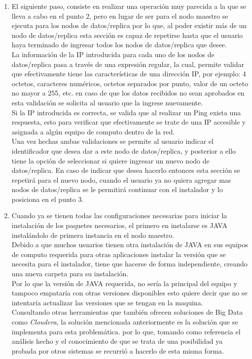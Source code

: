 \begin{enumerate}
	\item El siguiente paso, consiste en realizar una operación muy parecida a la que se lleva a cabo en el punto 2, pero en lugar de ser para el nodo maestro se ejecuta para los nodos de datos/replica por lo que, al poder existir más de un nodo de datos/replica esta sección es capaz de repetirse hasta que el usuario haya terminado de ingresar todos los nodos de datos/replica que desee.
	\\
	La información de la IP introducida para cada uno de los nodos de datos/replica pasa a través de una expresión regular, la cual, permite validar que efectivamente tiene las características de una dirección IP, por ejemplo: 4 octetos, caracteres numéricos, octetos separados por punto, valor de un octeto no mayor a 255, etc. en caso de que los datos recibidos no sean aprobados en esta validación se solicita al usuario que la ingrese nuevamente.
	\\
	Si la IP introducida es correcta, se valida que al realizar un Ping exista una respuesta, esto para verificar que efectivamente se trate de una IP accesible y asignada a algún equipo de computo dentro de la red.
	\\
	Una vez hechas ambas validaciones se permite al usuario indicar el identificador que desea dar a este nodo de datos/replica, y posterior a ello tiene la opción de seleccionar si quiere ingresar un nuevo nodo de datos/replica. En caso de indicar que desea hacerlo entonces esta sección se repetirá para el nuevo nodo, cuando el usuario ya no quiera agregar mas nodos de datos/replica se le permitirá continuar con el instalador y lo posiciona en el punto 3. 
	\item Cuando ya se tienen todas las configuraciones necesarias para iniciar la instalación de los paquetes necesarios, el primero en instalarse es JAVA instalándolo de primera instancia en el nodo maestro. 
	\\
	Debido a que muchos usuarios tienen otra instalación de JAVA en sus equipos de computo requerida para otras aplicaciones instalar la versión que se necesita para el instalador, tiene que hacerse de forma independiente, creando una nueva carpeta para su instalación.
	\\
	Por lo que la versión de JAVA requerida, no sería la principal del equipo y tampoco empataría con otras versiones disponibles esto quiere decir que no se intentaría actualizar las versiones que se tengan en la maquina. 
	\\
	Consultando otras herramientas que también ofrecen soluciones de Big Data como \emph{Cloudera}, la solución mencionada anteriormente es la solución que se implementa para esta problemática. por lo que, tomando como referencia el análisis hecho y el conocimiento de que se trata de una posibilidad ya probada por otros sistemas se recurrió a hacerlo de esta misma forma.

\end{enumerate}
